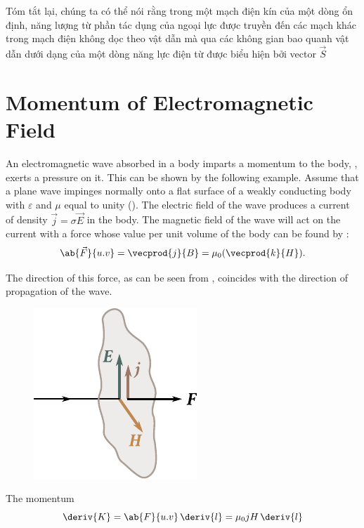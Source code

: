 Tóm tắt lại, chúng ta có thể nói rằng trong một mạch điện kín của một dòng ổn định, năng lượng từ phần tác dụng của ngoại lực được truyền đến các mạch khác trong mạch điện không dọc theo vật dẫn mà qua các không gian bao quanh vật dẫn dưới dạng của một dòng năng lực điện từ được biểu hiện bởi vector $\vec{S}$

\section{Momentum of Electromagnetic Field}\label{sec:15_5}

An electromagnetic wave absorbed in a body imparts a momentum to the body, \ie, exerts a pressure on it.
This can be shown by the following example.
Assume that a plane wave impinges normally onto a flat surface of a weakly conducting body with $\varepsilon$ and $\mu$ equal to unity ().
The electric field of the wave produces a current of density $\vec{j} = \sigma\vec{E}$ in the body.
The magnetic field of the wave will act on the current with a force whose value per unit volume of the body can be found by :
\begin{equation*}
    \ab{\vec{F}}{u.v} = \vecprod{j}{B} = \mu_0 (\vecprod{k}{H}).
\end{equation*}

\noindent
The direction of this force, as can be seen from , coincides with the direction of propagation of the wave.

\begin{figure}[!htb]
	\begin{center}
		\includegraphics[scale=1]{figures/ch_15/fig_15_4.pdf}
		\caption[]{}
		\label{fig:15_4}
	\end{center}
	\vspace{-0.8cm}
\end{figure}

The momentum
\begin{equation}\label{eq:15_33}
    \deriv{K} = \ab{F}{u.v}\, \deriv{l} = \mu_0 j H\, \deriv{l}
\end{equation}

